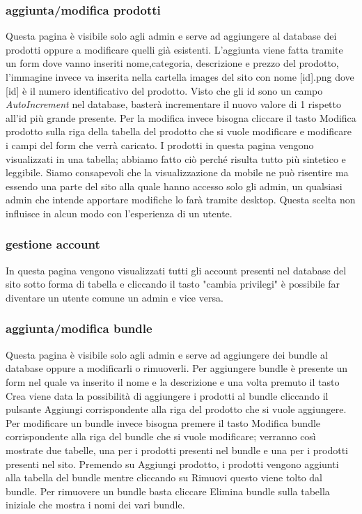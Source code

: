 \subsubsection{aggiunta/modifica prodotti}
Questa pagina è visibile solo agli admin e serve ad aggiungere al database dei prodotti oppure a modificare quelli già esistenti.\newline
L'aggiunta viene fatta tramite un form dove vanno inseriti nome,categoria, descrizione e prezzo del prodotto, l'immagine invece va inserita nella cartella images del sito con nome [id].png dove [id] è il numero identificativo del prodotto. Visto che gli id sono un campo \emph{AutoIncrement} nel database, basterà incrementare il nuovo valore di 1 rispetto all'id più grande presente.\newline
Per la modifica invece bisogna cliccare il tasto Modifica prodotto sulla riga della tabella del prodotto che si vuole modificare e modificare i campi del form che verrà caricato.\newline
I prodotti in questa pagina vengono visualizzati in una tabella; abbiamo fatto ciò perché risulta tutto più sintetico e leggibile.\newline
Siamo consapevoli che la visualizzazione da mobile ne può risentire ma essendo una parte del sito alla quale hanno accesso solo gli admin, un qualsiasi admin che intende apportare modifiche lo farà tramite desktop.
Questa scelta non influisce in alcun modo con l'esperienza di un utente.

\subsubsection{gestione account}
In questa pagina vengono visualizzati tutti gli account presenti nel database del sito sotto forma di tabella e cliccando il tasto "cambia privilegi" è possibile far diventare un utente comune un admin e vice versa.

\subsubsection{aggiunta/modifica bundle}
Questa pagina è visibile solo agli admin e serve ad aggiungere dei bundle al database oppure a modificarli o rimuoverli.
Per aggiungere bundle è presente un form nel quale va inserito il nome e la descrizione e una volta premuto il tasto Crea viene data la possibilità di aggiungere i prodotti al bundle cliccando il pulsante Aggiungi corrispondente alla riga del prodotto che si vuole aggiungere.\newline
Per modificare un bundle invece bisogna premere il tasto Modifica bundle corrispondente alla riga del bundle che si vuole modificare; verranno così mostrate due tabelle, una per i prodotti presenti nel bundle e una per i prodotti presenti nel sito.\newline
 Premendo su Aggiungi prodotto, i prodotti vengono aggiunti alla tabella del bundle mentre cliccando su Rimuovi questo viene tolto dal bundle.\newline
Per rimuovere un bundle basta cliccare Elimina bundle sulla tabella iniziale che mostra i nomi dei vari bundle.

